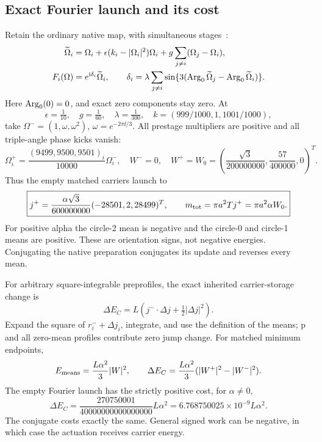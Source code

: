 \subsection{Exact Fourier launch and its cost}
Retain the ordinary native map, with simultaneous stages~\cite{RX}:
\begin{align}
\widetilde\Omega_i&=\Omega_i+\epsilon(k_i-|\Omega_i|^2)\Omega_i
+g\sum_{j\ne i}(\Omega_j-\Omega_i),\notag\\
F_i(\Omega)&=e^{\mathrm i\delta_i}\widetilde\Omega_i,\qquad
\delta_i=\lambda\sum_{j\ne i}\sin\{3(\operatorname{Arg}_0\widetilde\Omega_j-\operatorname{Arg}_0\widetilde\Omega_i)\}.
\label{eq:F}
\end{align}
Here \(\operatorname{Arg}_0(0)=0\), and exact zero components stay zero. At
\begin{equation}\label{eq:tuple}
\epsilon=\tfrac1{10},\quad g=\tfrac1{60},\quad\lambda=\tfrac1{300},
\quad k=(999/1000,1,1001/1000),
\end{equation}
take \(\Omega^-=(1,\omega,\omega^2)\), \(\omega=e^{-2\pi\ii/3}\).
All prestage multipliers are positive and all triple-angle phase kicks vanish:
\begin{equation}\label{eq:Fourier}
\Omega_i^+=\frac{(9499,9500,9501)_i}{10000}\Omega_i^-,
\quad W^-=0,\quad
W^+=W_0=\left(\frac{\sqrt3}{200000000},\frac{57}{400000},0\right)^T.
\end{equation}
Thus the empty matched carriers launch to
\begin{equation}\label{eq:launch}
\boxed{j^+=\frac{\alpha\sqrt3}{600000000}(-28501,2,28499)^T,\qquad
m_{\rm tot}=\pi a^2Tj^+=\pi a^2\alpha W_0.}
\end{equation}
For positive alpha the circle-2 mean is negative and the circle-0 and circle-1 means are positive. These are orientation signs, not negative energies. Conjugating the native preparation conjugates its update and reverses every mean.

For arbitrary square-integrable preprofiles, the exact inherited carrier-storage change is
\begin{equation}\label{eq:work}
\boxed{\Delta E_C=L\left(j^-\cdot\Delta j+\tfrac12|\Delta j|^2\right).}
\end{equation}
Expand the square of \(r_i^-+\Delta j_i\), integrate, and use the definition of the means; p and all zero-mean profiles contribute zero jump change. For matched minimum endpoints,
\begin{equation}\label{eq:matchedwork}
E_{\rm means}=\frac{L\alpha^2}{3}|W|^2,\qquad
\Delta E_C=\frac{L\alpha^2}{3}(|W^+|^2-|W^-|^2).
\end{equation}
The empty Fourier launch has the strictly positive cost, for \(\alpha\ne0\),
\begin{equation}\label{eq:launchcost}
\boxed{\Delta E_C=
\frac{270750001}{40000000000000000}L\alpha^2
=6.768750025\times10^{-9}L\alpha^2.}
\end{equation}
The conjugate costs exactly the same. General signed work can be negative, in which case the actuation receives carrier energy.

